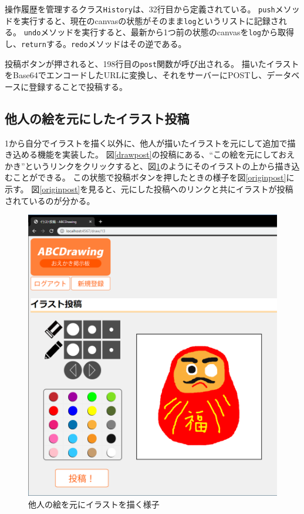 \documentclass[a4j,titlepage]{jsarticle}
\begin{document}
操作履歴を管理するクラス\texttt{History}は、32行目から定義されている。
\texttt{push}メソッドを実行すると、現在のcanvasの状態がそのまま\texttt{log}というリストに記録される。
\texttt{undo}メソッドを実行すると、最新から1つ前の状態のcanvasを\texttt{log}から取得し、\texttt{return}する。\texttt{redo}メソッドはその逆である。

投稿ボタンが押されると、198行目の\texttt{post}関数が呼び出される。
描いたイラストをBase64でエンコードしたURLに変換し、それをサーバーにPOSTし、データベースに登録することで投稿する。

\subsection{他人の絵を元にしたイラスト投稿}
1から自分でイラストを描く以外に、他人が描いたイラストを元にして追加で描き込める機能を実装した。
図\ref{drawpost}の投稿にある、``この絵を元にしておえかき''というリンクをクリックすると、図\ref{origin}のようにそのイラストの上から描き込むことができる。
この状態で投稿ボタンを押したときの様子を図\ref{originpost}に示す。
図\ref{originpost}を見ると、元にした投稿へのリンクと共にイラストが投稿されているのが分かる。

\begin{figure}[H]
  \centering
  \includegraphics[width=14cm]{origindraw.png}
  \caption{他人の絵を元にイラストを描く様子}
  \label{origin}
\end{figure}
\end{document}
